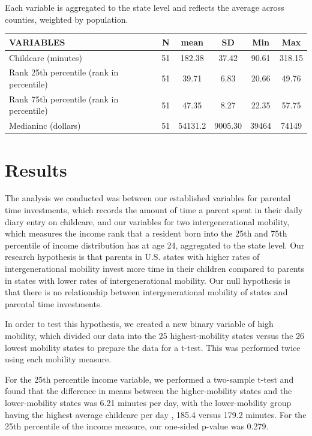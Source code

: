 \documentclass[12pt]{article}
\begin{document}
Each variable is aggregated to the state level and reflects the average across counties, weighted by population. 

\begin{center} 

\begin{tabularx}{\textwidth}{Y c c c c c}
\small
VARIABLES & N & mean & SD & Min & Max \\ \hline
Childcare (minutes) & 51 & 182.38 & 37.42 & 90.61 & 318.15 \\
Rank 25th percentile (rank in percentile) & 51 & 39.71 & 6.83 & 20.66 & 49.76 \\
Rank 75th percentile (rank in percentile) & 51 & 47.35 & 8.27& 22.35 & 57.75 \\
Medianinc (dollars) & 51 & 54131.2 & 9005.30 & 39464 & 74149 \\
\hline
\end{tabularx}
\end{center}

\section{Results}
The analysis we conducted was between our established variables for parental time investments, which records the amount of time a parent spent in their daily diary entry on childcare, and our variables for two intergenerational mobility, which measures the income rank that a resident born into the 25th and 75th percentile of income distribution has at age 24, aggregated to the state level. 
Our research hypothesis is that parents in U.S. states with higher rates of intergenerational mobility invest more time in their children compared to parents in states with lower rates of intergenerational mobility. Our null hypothesis is that there is no relationship between intergenerational mobility of states and parental time investments. 

In order to test this hypothesis, we created a new binary variable of high mobility, which divided our data into the 25 highest-mobility states versus the 26 lowest mobility states to prepare the data for a t-test. This was performed twice using each mobility measure. 

For the 25th percentile income variable, we performed a two-sample t-test and found that the difference in means between the higher-mobility states and the lower-mobility states was 6.21 minutes per day, with the lower-mobility group having the highest average childcare per day , 185.4 versus 179.2 minutes. For the 25th percentile of the income measure, our one-sided p-value was 0.279.
\end{document}
